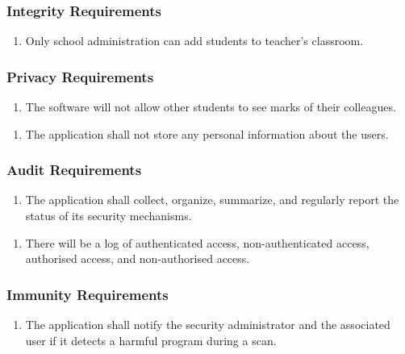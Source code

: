 \documentclass[]{article}
\begin{document}
\subsubsection{Integrity Requirements}
\label{ssub:integrity_requirements}
\begin{enumerate}[{SR}1. ]
	\item Only school administration can add students
	to teacher's classroom.
\end{enumerate}

\subsubsection{Privacy Requirements}
\label{ssub:privacy_requirements}
\begin{enumerate}[{SR}1. ]
	\item The software will not allow other students to see marks of their colleagues.
\end{enumerate}
\begin{enumerate}[{SR}2. ]
	\item The application shall not store any personal information about the users.
\end{enumerate}

\subsubsection{Audit Requirements}
\label{ssub:audit_requirements}
\begin{enumerate}[{SR}1. ]
	\item The application shall collect, organize, summarize, and regularly report the status of its security mechanisms.
\end{enumerate}
\begin{enumerate}[{SR}2. ]
	\item There will be a log of authenticated access, non-authenticated access, authorised access, and non-authorised access.
\end{enumerate}

\subsubsection{Immunity Requirements}
\label{ssub:immunity_requirements}
\begin{enumerate}[{SR}1. ]
	\item The application shall notify the security administrator and the associated user if it detects a harmful program during a scan.
\end{enumerate}
\end{document}
